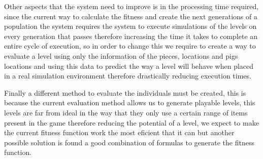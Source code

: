 \documentclass[conference]{IEEEtran}
\begin{document}
Other aspects that the system need to improve is in the processing time
required, since the current way to calculate the fitness and create the next
generations of a population the system requires the system to execute
simulations of the levels on every generation that passes therefore increasing
the time it takes to complete an entire cycle of execution, so in order to
change this we require to create a way to evaluate a level using only the
information of the pieces, locations and pigs locations and using this data to
predict the way a level will behave when placed in a real simulation environment
therefore drastically reducing execution times.

Finally a different method to evaluate the individuals must be created, this is
because the current evaluation method allows us to generate playable levels,
this levels are far from ideal in the way that they only use a certain range of
items present in the game therefore reducing the potential of a level, we expect
to make the current fitness function work the most eficient that it can but
another possible solution is found a good combination of formulas to generate
the fitness function.

\printbibliography
\newrefcontext[sorting=ydnt]
\end{document}

